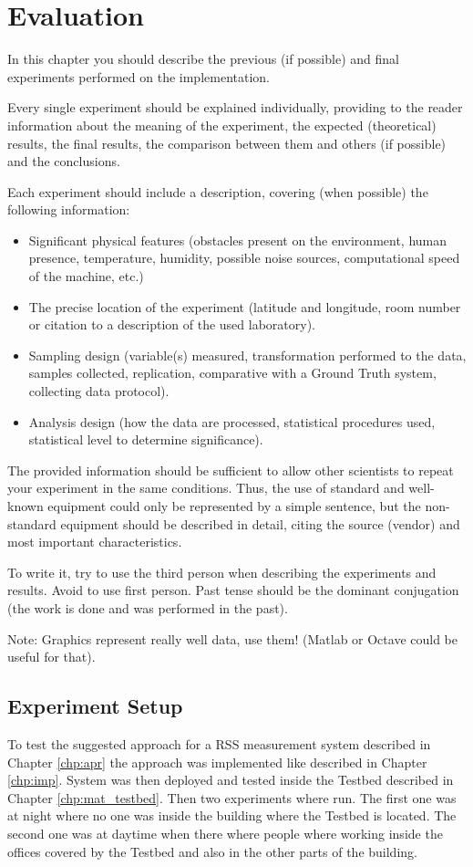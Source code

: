 \chapter{Evaluation}

In this chapter you should describe the previous (if possible) and final experiments performed on the implementation.

Every single experiment should be explained individually, providing to the reader information about the meaning of the experiment, the expected (theoretical) results, the final results, the comparison between them and others (if possible) and the conclusions. 

Each experiment should include a description, covering (when possible) the following information:
\begin{itemize}
	\item Significant physical features (obstacles present on the environment, human presence, temperature, humidity, possible noise sources, computational speed of the machine, etc.)
	\item The precise location of the experiment (latitude and longitude, room number or citation to a description of the used laboratory).
	\item Sampling design (variable(s) measured, transformation performed to the data, samples collected, replication, comparative with a Ground Truth system, collecting data protocol).
	\item Analysis design (how the data are processed, statistical procedures used, statistical level to determine significance).
\end{itemize}
The provided information should be sufficient to allow other scientists to repeat your experiment in the same conditions. Thus, the use of standard and well-known equipment could only be represented by a simple sentence, but the non-standard equipment should be described in detail, citing the source (vendor) and most important characteristics.

To write it, try to use the third person when describing the experiments and results. Avoid to use first person. Past tense should be the dominant conjugation (the work is done and was performed in the past).

Note: Graphics represent really well data, use them! (Matlab or Octave could be useful for that).

\section{Experiment Setup}
To test the suggested approach for a RSS measurement system described in Chapter \ref{chp:apr} the approach was implemented like described in Chapter \ref{chp:imp}. System was then deployed and tested inside the Testbed described in Chapter \ref{chp:mat_testbed}. Then two experiments where run. The first one was at night where no one was inside the building where the Testbed is located. The second one was at daytime when there where people where working inside the offices covered by the Testbed and also in the other parts of the building. 

